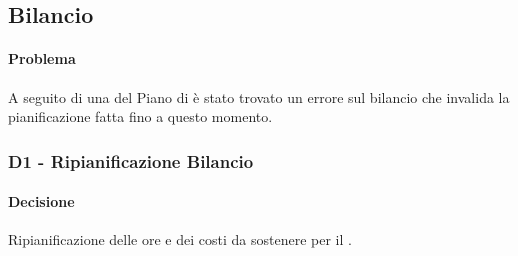 \subsection{Bilancio}\label{pBil}
\paragraph{Problema}
A seguito di una \textit{} del Piano di  è stato trovato un errore sul bilancio che invalida la pianificazione fatta fino a questo momento.
\subsubsection{\textbf{D1} - Ripianificazione Bilancio}\label{dBil}
\paragraph{Decisione}
Ripianificazione delle ore e dei costi da sostenere per il .

